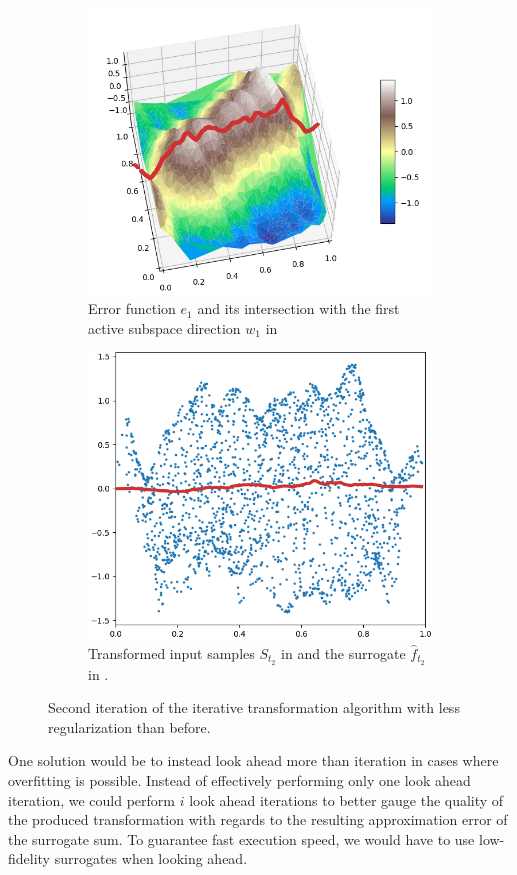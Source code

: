 \documentclass[
  a4paper,  %
  twoside,  %
  bibliography=totoc,
  headsepline,
  cleardoublepage=empty,
  parskip=half,
  draft=false
]{scrbook}
\begin{document}
\begin{mdframed}[style=style]
\begin{figure}[H]
\begin{subfigure}{.5\textwidth}
  \centering
  \includegraphics[width=.85\linewidth]{graphics/pipeline_bad_current_2.png}
  \caption{Error function $e_1$ and its intersection with the first active subspace direction $w_1$ in \reddot}
\label{fig:pipeline_bad_current_2}
\end{subfigure}%
\begin{subfigure}{.5\textwidth}
  \centering
  \includegraphics[width=.85\linewidth]{graphics/pipeline_bad_local_2.png}
  \caption{Transformed input samples $S_{t_2}$ in \blue and the surrogate $\hat{f}_{t_2}$ in \red.}
\label{fig:pipeline_bad_local_2}
\end{subfigure}
\delimit
\caption{Second iteration of the iterative transformation algorithm with less regularization than before.}
\label{fig:pipeline_bad_2}
\end{figure}
\end{mdframed}
%
One solution would be to instead look ahead more than iteration in cases where overfitting is possible.
Instead of effectively performing only one look ahead iteration, we could perform $i$ look ahead iterations to better gauge the quality of the produced transformation with regards to the resulting approximation error of the surrogate sum.
To guarantee fast execution speed, we would have to use low-fidelity surrogates when looking ahead.
\end{document}
